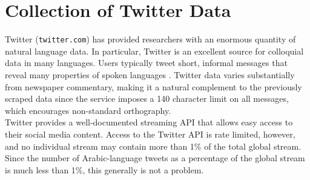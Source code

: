 \documentclass[10pt, a4paper]{article}
\begin{document}
\section{Collection of Twitter Data}\label{sec:twitter}

Twitter (\texttt{twitter.com}) has provided researchers with an
enormous quantity of natural language data. In particular, Twitter is
an excellent source for colloquial data in many languages. Users
typically tweet short, informal messages that reveal many properties
of spoken languages \cite{eisenstein2013phonological}. Twitter data
varies substantially from newspaper commentary, making it a natural complement
to the previously scraped data since the service imposes a 140 character limit
on all messages, which encourages non-standard orthography.
\\
Twitter provides a well-documented streaming API that allows easy access to their
social media content. %
Access to the Twitter API is rate limited, however, and no individual stream may
contain more than 1\% of the total global stream. 
Since the number of Arabic-language
tweets as a percentage of the global stream is much less than 1\%,
this generally is not a problem.

\end{document}
